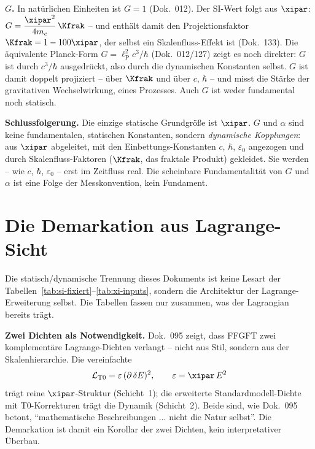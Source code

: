 \textbf{$G$.} In natürlichen Einheiten ist $G=1$ (Dok.~012). Der SI-Wert folgt aus
$\xipar$: $G=\dfrac{\xipar^2}{4m_e}\,\Kfrak$ -- und enthält damit den
Projektionsfaktor $\Kfrak=1-100\xipar$, der selbst ein Skalenfluss-Effekt ist
(Dok.~133). Die äquivalente Planck-Form $G=\ell_{\mathrm P}^2 c^3/\hbar$
(Dok.~012/127) zeigt es noch direkter: $G$ ist durch $c^3/\hbar$ ausgedrückt, also
durch die dynamischen Konstanten selbst. $G$ ist damit doppelt projiziert -- über
$\Kfrak$ und über $c$, $\hbar$ -- und misst die Stärke der gravitativen
Wechselwirkung, eines Prozesses. Auch $G$ ist weder fundamental noch statisch.

\begin{schlussfolgerung}
\textbf{Schlussfolgerung.} Die einzige statische Grundgröße ist $\xipar$. $G$ und
$\alpha$ sind keine fundamentalen, statischen Konstanten, sondern \emph{dynamische
Kopplungen}: aus $\xipar$ abgeleitet, mit den Einbettungs-Konstanten $c$, $\hbar$,
$\varepsilon_0$ angezogen und durch Skalenfluss-Faktoren ($\Kfrak$, das fraktale
Produkt) gekleidet. Sie werden -- wie $c$, $\hbar$, $\varepsilon_0$ -- erst im
Zeitfluss real. Die scheinbare Fundamentalität von $G$ und $\alpha$ ist eine Folge
der Messkonvention, kein Fundament.
\end{schlussfolgerung}

\section{Die Demarkation aus Lagrange-Sicht}

Die statisch/dynamische Trennung dieses Dokuments ist keine Lesart der
Tabellen~\ref{tab:si-fixiert}--\ref{tab:xi-inputs}, sondern die Architektur der
Lagrange-Erweiterung selbst. Die Tabellen fassen nur zusammen, was der Lagrangian
bereits trägt.

\textbf{Zwei Dichten als Notwendigkeit.} Dok.~095 zeigt, dass FFGFT zwei
komplementäre Lagrange-Dichten verlangt -- nicht aus Stil, sondern aus der
Skalenhierarchie. Die vereinfachte
\[
  \mathcal{L}_{\mathrm{T0}} = \varepsilon\,(\partial\,\delta E)^2,
  \qquad \varepsilon = \xipar\,E^2
\]
trägt reine $\xipar$-Struktur (Schicht~1); die erweiterte Standardmodell-Dichte mit
T0-Korrekturen trägt die Dynamik (Schicht~2). Beide sind, wie Dok.~095 betont,
``mathematische Beschreibungen ... nicht die Natur selbst''. Die Demarkation ist
damit ein Korollar der zwei Dichten, kein interpretativer Überbau.

